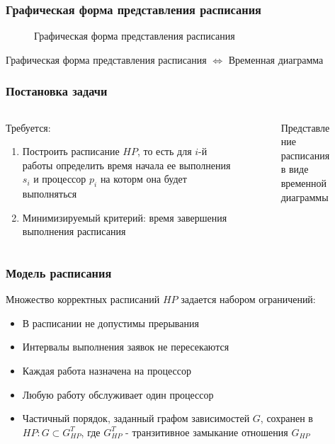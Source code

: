 \begin{frame}
    \frametitle{Графическая форма представления расписания}
    \begin{figure}
        \small
        \captionsetup{labelformat=empty}
        \caption{\small Графическая форма представления расписания}
    \end{figure}
    Графическая форма представления расписания $\Leftrightarrow$ Временная диаграмма
\end{frame}

\begin{frame}
    \frametitle{Постановка задачи}
    \begin{columns}
        \begin{column}{0.7\textwidth}
            Требуется:
            \begin{enumerate}
                \item Построить расписание $HP$, то есть для $i$-й работы определить время начала ее выполнения $s_i$ и процессор $p_i$ на которм она будет выполняться
                \item Минимизируемый критерий: время завершения выполнения расписания
            \end{enumerate}
        \end{column}
        \begin{column}{0.3\textwidth}
            \begin{figure}
                \tiny
                \captionsetup{labelformat=empty}
                \caption{\small Представление расписания в виде временной диаграммы}
            \end{figure}
        \end{column}
    \end{columns}
\end{frame}

\begin{frame}
    \frametitle{Модель расписания}
    Множество корректных расписаний $HP$ задается набором ограничений:
    \begin{itemize}
        \item В расписании не допустимы прерывания
        \item Интервалы выполнения заявок не пересекаются
        \item Каждая работа назначена на процессор
        \item Любую работу обслуживает один процессор
        \item Частичный порядок, заданный графом зависимостей $G$, сохранен в $HP: G \subset G_{HP}^T$, где $G_{HP}^T$ - транзитивное замыкание отношения $G_{HP}$
    \end{itemize}
\end{frame}

